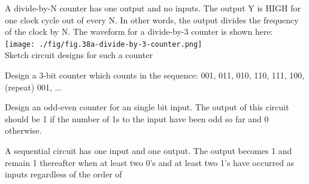 \begin{prob}
  A divide-by-N counter has one output and no inputs. The output Y is HIGH for
  one clock cycle out of every N. In other words, the output divides the frequency
  of the clock by N. The waveform for a divide-by-3 counter is shown here:\\
  \texttt{[image: ./fig/fig.38a-divide-by-3-counter.png]}\\
  Sketch circuit designs for such a counter
\end{prob}

\begin{prob}
  Design a 3-bit counter which counts in the sequence:
  001, 011, 010, 110, 111, 100, (repeat) 001, ...
\end{prob}

\begin{example}
  Design an odd-even counter for an single bit input. The output of this circuit
  should be 1 if the number of 1s to the input have been odd so far and 0
  otherwise.
\end{example}

\begin{example}
  A sequential circuit has one input and one output. The output becomes 1 and
  remain 1 thereafter when at least two 0's and at least two 1's have occurred
  as inputs regardless of the order of 
\end{example}

